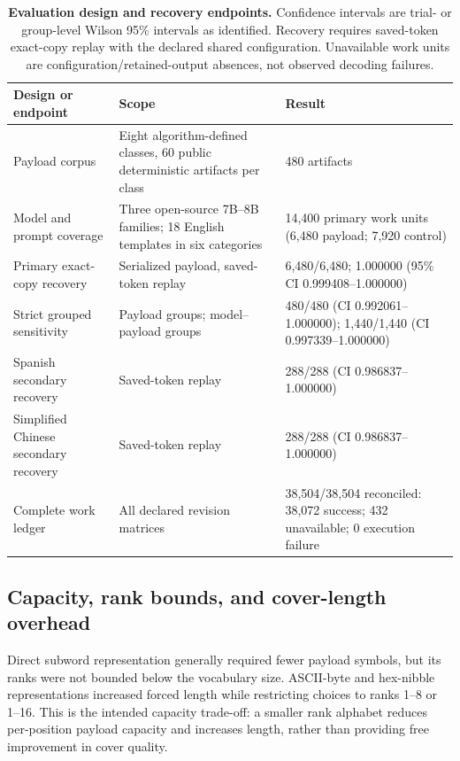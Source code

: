 \documentclass[fleqn,10pt]{wlscirep}
\begin{document}
\begin{table}[H]
\centering
\small
\begin{tabularx}{\textwidth}{L{0.25\textwidth}Y L{0.24\textwidth}}
\toprule
Design or endpoint & Scope & Result \\
\midrule
Payload corpus & Eight algorithm-defined classes, 60 public deterministic artifacts per class & 480 artifacts \\
Model and prompt coverage & Three open-source 7B--8B families; 18 English templates in six categories & 14,400 primary work units (6,480 payload; 7,920 control) \\
Primary exact-copy recovery & Serialized payload, saved-token replay & 6,480/6,480; 1.000000 (95\% CI 0.999408--1.000000) \\
Strict grouped sensitivity & Payload groups; model--payload groups & 480/480 (CI 0.992061--1.000000); 1,440/1,440 (CI 0.997339--1.000000) \\
Spanish secondary recovery & Saved-token replay & 288/288 (CI 0.986837--1.000000) \\
Simplified Chinese secondary recovery & Saved-token replay & 288/288 (CI 0.986837--1.000000) \\
Complete work ledger & All declared revision matrices & 38,504/38,504 reconciled: 38,072 success; 432 unavailable; 0 execution failure \\
\bottomrule
\end{tabularx}
\caption{\label{tab:design-recovery}\textbf{Evaluation design and recovery endpoints.} Confidence intervals are trial- or group-level Wilson 95\% intervals as identified. Recovery requires saved-token exact-copy replay with the declared shared configuration. Unavailable work units are configuration/retained-output absences, not observed decoding failures.}
\end{table}

\subsection*{Capacity, rank bounds, and cover-length overhead}\label{sec:results-capacity}

Direct subword representation generally required fewer payload symbols, but its ranks were not bounded below the vocabulary size. ASCII-byte and hex-nibble representations increased forced length while restricting choices to ranks 1--8 or 1--16. This is the intended capacity trade-off: a smaller rank alphabet reduces per-position payload capacity and increases length, rather than providing free improvement in cover quality.
\end{document}
